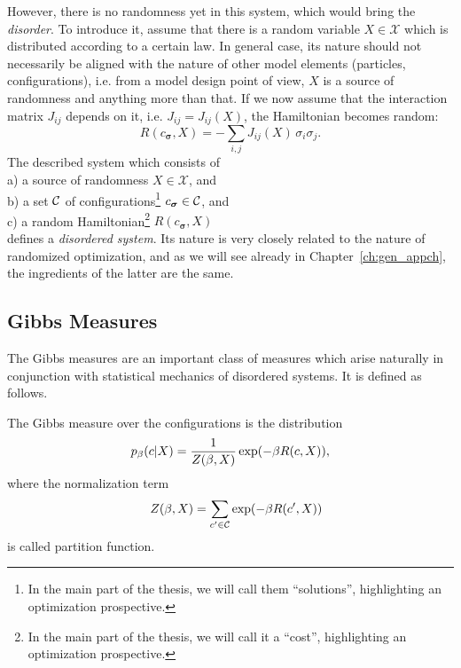 However, there is no randomness yet in this system, which would bring the
\textit{disorder}. To introduce it, assume that there is a random variable $X
\in \mathcal{X}$ which is distributed according to a certain law. In general case,
its nature should not necessarily be aligned with the nature of other model
elements (particles, configurations), i.e. from a model design point of view,
$X$ is a source of randomness and anything more than that. If we now assume that
the interaction matrix $J_{ij}$ depends on it, i.e. $J_{ij} = J_{ij}(X)$, the
Hamiltonian becomes random:
\begin{equation}
  R(c_{\boldsymbol\sigma}, X) = -\sum_{i,j} J_{ij}(X) \, \sigma_i \sigma_j.
\end{equation}
The described system which consists of \\
%
\hspace*{1.5\parindent} a) a source of randomness $X \in \mathcal{X}$, and \\
%
\hspace*{1.5\parindent} b) a set ${\cal C}$ of configurations\footnote{In the main part of
the thesis, we will call them ``solutions'', highlighting an optimization
prospective.} $c_{\boldsymbol\sigma}\in {\cal C}$, and \\
%
\hspace*{1.5\parindent} c) a random Hamiltonian\footnote{In the main part of the
thesis, we will call it a ``cost'', highlighting an optimization prospective.}
$R(c_{\boldsymbol\sigma}, X)$ \\ 
%
defines a \textit{disordered system}. Its nature is very closely related to the nature
of randomized optimization, and as we will see already in
Chapter~\ref{ch:gen_appch}, the ingredients of the latter are the same.

\subsection{Gibbs Measures}
The Gibbs measures are an important class of measures which arise naturally in conjunction
with statistical mechanics of disordered systems. It is defined as follows.

\begin{definition}
  The Gibbs measure over the configurations is the distribution
  \begin{equation}
    p_\beta(c | X) =\frac{1}{Z(\beta, X)} \exp(-\beta R(c, X)),
  \end{equation}
  where the normalization term
  \begin{equation}
    \quad Z(\beta, X) = \sum_{c^\prime\in {\cal C}} \exp(-\beta R(c^\prime, X))
  \end{equation}
  is called partition function.
\end{definition}

